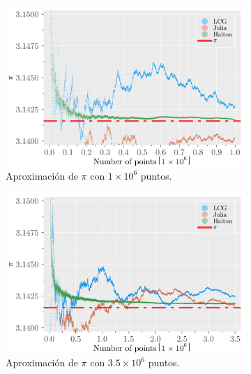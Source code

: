 \begin{enumerate}
\begin{solution}
        \clearpage
        \begin{figure}
            \centering
            \begin{subfigure}{0.45\textwidth}
                \centering
                \includegraphics[scale=0.065]{../figures/pies_1E6.png}
                \caption{Aproximación de $\pi$ con $1 \times 10^6$ puntos.}
            \end{subfigure}
            \hfill
            \begin{subfigure}{0.45\textwidth}
                \centering
                \includegraphics[scale=0.065]{../figures/pies_3dot5E6.png}
                \caption{Aproximación de $\pi$ con $3.5 \times 10^6$ puntos.}
            \end{subfigure}
            \begin{subfigure}{0.45\textwidth}
                \centering

\end{subfigure}
\end{figure}
\end{solution}
\end{enumerate}
